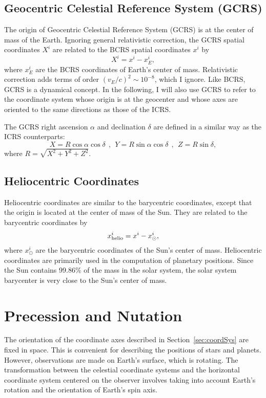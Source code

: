 \documentclass[12pt]{article}
\newcommand \beq {\begin{equation}}
\newcommand \eeq {\end{equation}}
\begin{document}
\subsection{Geocentric Celestial Reference System (GCRS)}

The origin of Geocentric Celestial Reference System (GCRS) is at the 
center of mass of the Earth. 
Ignoring general relativistic correction, the GCRS spatial coordinates $X^i$ 
are related to the BCRS spatial coordinates $x^i$ by 
\beq
  X^i = x^i - x^i_E ,
\label{eq:GCRSX}
\eeq
where $x^i_E$ are the BCRS coordinates of Earth's center of mass. Relativistic 
correction adds terms of order $(v_E/c)^2 \sim 10^{-8}$, which I ignore. Like 
BCRS, GCRS is a dynamical concept. In the following, I will also use GCRS 
to refer to the coordinate system whose origin is at the geocenter and whose 
axes are oriented to the same directions as those of the ICRS.

The GCRS right ascension $\alpha$ and declination $\delta$ are defined in a
similar way as the ICRS counterparts:
\beq
  X = R \cos \alpha \cos \delta \ \ , \ \
  Y = R \sin \alpha \cos \delta \ \ , \ \
  Z = R \sin \delta ,
\label{eq:GCRScoord}
\eeq
where $R=\sqrt{X^2+Y^2+Z^2}$.

\subsection{Heliocentric Coordinates} 

Heliocentric coordinates are similar to the barycentric coordinates, 
except that the origin is located at the center of mass of the Sun. 
They are related to the barycentric coordinates by 
\beq
 x^i_{\rm helio} = x^i - x^i_{\odot} ,
\eeq
where $x^i_{\odot}$ are the barycentric coordinates of the Sun's center 
of mass. Heliocentric coordinates are primarily used in the computation 
of planetary positions. Since the Sun contains 99.86\% of the mass 
in the solar system, the solar system barycenter is very close to the 
Sun's center of mass.

\section{Precession and Nutation}
\label{sec:precessionNutation}

The orientation of the coordinate axes described in Section~\ref{sec:coordSys} 
are fixed in space. This is convenient for describing the positions of 
stars and planets. However, observations are made on Earth's surface, which 
is rotating. The transformation between the celestial coordinate systems and 
the horizontal coordinate system centered on the observer involves taking into 
account Earth's rotation and the orientation of Earth's spin axis. 
\end{document}
